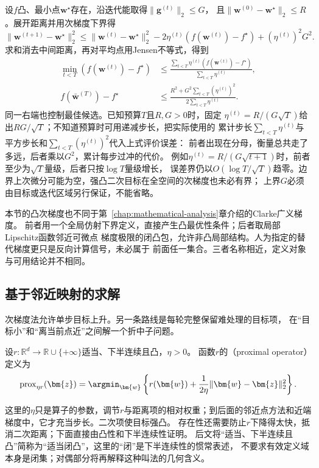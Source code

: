 设$f$凸、最小点$\bm w^\star$存在，沿迭代能取得$\|\bm g^{(t)}\|_2\leq G$，
且$\|\bm w^{(0)}-\bm w^\star\|_2\leq R$。展开距离并用次梯度下界得
\[
 \|\bm w^{(t+1)}-\bm w^\star\|_2^2
 \leq\|\bm w^{(t)}-\bm w^\star\|_2^2
 -2\eta^{(t)}(f(\bm w^{(t)})-f^\star)+(\eta^{(t)})^2G^2.
\]
求和消去中间距离，再对平均点用Jensen不等式，得到
\begin{equation}
\begin{aligned}
 \min_{t<T}(f(\bm w^{(t)})-f^\star)
 &\leq\frac{\sum_{t<T}\eta^{(t)}(f(\bm w^{(t)})-f^\star)}{\sum_{t<T}\eta^{(t)}},\\
 f(\bar{\bm w}^{(T)})-f^\star
 &\leq\frac{R^2+G^2\sum_{t<T}(\eta^{(t)})^2}{2\sum_{t<T}\eta^{(t)}}.
\end{aligned}
 \label{eq:opt-subgradient-finite-rate}
\end{equation}
同一右端也控制最佳候选。已知预算$T$且$R,G>0$时，固定
$\eta^{(t)}=R/(G\sqrt T)$给出$RG/\sqrt T$；不知道预算时可用递减步长，把实际使用的
累计步长$\sum_{t<T}\eta^{(t)}$与平方步长和$\sum_{t<T}(\eta^{(t)})^2$代入上式评价误差：
前者出现在分母，衡量总共走了多远，后者乘以$G^2$，累计每步过冲的代价。
例如$\eta^{(t)}=R/(G\sqrt{t+1})$时，前者至少为$\sqrt T$量级，后者只按$\log T$量级增长，
误差界仍以$O(\log T/\sqrt T)$趋零。边界上次微分可能为空，强凸二次目标在全空间的次梯度也未必有界；
上界$G$必须由目标或迭代区域另行保证，不能省略。

本节的凸次梯度也不同于第~\ref{chap:mathematical-analysis}章介绍的Clarke广义梯度。
前者用一个全局仿射下界定义，直接产生凸最优性条件；后者取局部Lipschitz函数邻近可微点
梯度极限的闭凸包，允许非凸局部结构。人为指定的替代梯度更只是反向计算信号，未必属于
前面任一集合。三者名称相近，定义对象与可用结论并不相同。

\subsection{基于邻近映射的求解}
\label{sec:opt-nonsmooth-proximal}
\label{sec:opt-weaker-curvature}

次梯度法允许单步目标上升。另一条路线是每轮完整保留难处理的目标项，
在“目标小”和“离当前点近”之间解一个折中子问题。
\begin{definition}[凸函数的邻近算子]
\label{def:opt-proximal-operator}
设$r:\mathbb R^d\to\mathbb R\cup\{+\infty\}$适当、下半连续且凸，$\eta>0$。
函数$r$的（proximal operator）定义为
\[
  \operatorname{prox}_{\eta r}(\bm{z})
  =\argmin_{\bm{w}}
  \left\{r(\bm{w})+\frac{1}{2\eta}
  \lVert\bm{w}-\bm{z}\rVert_2^2\right\}.
\]
\end{definition}
这里的$\eta$只是算子的参数，调节$r$与距离项的相对权重；到后面的邻近点方法和近端梯度中，它才充当步长。二次项使目标强凸。
存在性还需要防止$r$下降得太快，抵消二次距离；下面直接由凸性和下半连续性证明。
后文将“适当、下半连续且凸”简称为“适当闭凸”，这里的“闭”是下半连续性的惯常表述，
不要求有效定义域本身是闭集；对偶部分将再解释这种叫法的几何含义。

